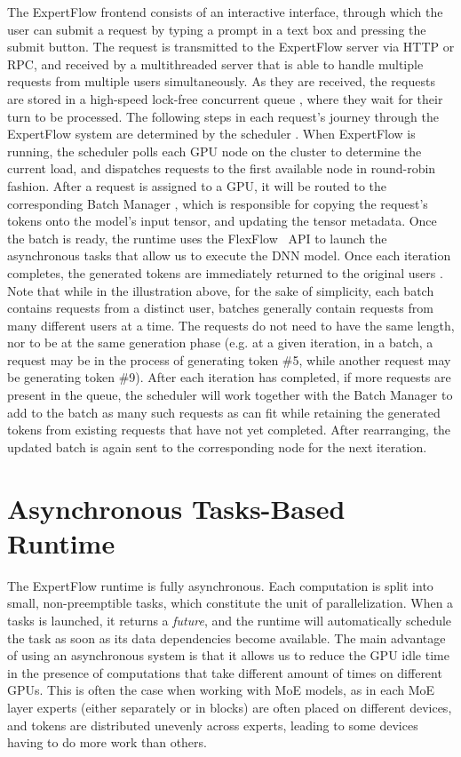 The ExpertFlow frontend consists of an interactive interface, through which the user can submit a request  by typing a prompt in a text box and pressing the submit button. The request is transmitted to the ExpertFlow server via HTTP or RPC, and received by a multithreaded server that is able to handle multiple requests from multiple users simultaneously. As they are received, the requests are stored in a high-speed lock-free concurrent queue , where they wait for their turn to be processed. The following steps in each request's journey through the ExpertFlow system are determined by the scheduler . When ExpertFlow is running, the scheduler polls each GPU node on the cluster to determine the current load, and dispatches requests to the first available node in round-robin fashion. After a request is assigned to a GPU, it will be routed to the corresponding Batch Manager , which is responsible for copying the request's tokens onto the model's input tensor, and updating the tensor metadata. Once the batch is ready, the runtime uses the FlexFlow~\cite{flexflow, unity} API to launch the asynchronous tasks  that allow us to execute the DNN model. Once each iteration completes, the generated tokens are immediately returned to the original users . Note that while in the illustration above, for the sake of simplicity, each batch contains requests from a distinct user, batches generally contain requests from many different users at a time. The requests do not need to have the same length, nor to be at the same generation phase (e.g. at a given iteration, in a batch, a request may be in the process of generating token \#5, while another request may be generating token \#9). After each iteration has completed, if more requests are present in the queue, the scheduler  will work together with the Batch Manager to add to the batch as many such requests as can fit while retaining the generated tokens from existing requests that have not yet completed. After rearranging, the updated batch is again sent to the corresponding node for the next iteration.

\section{Asynchronous Tasks-Based Runtime}\label{design-asynchronous-runtime}
The ExpertFlow runtime is fully asynchronous. Each computation is split into small, non-preemptible tasks, which constitute the unit of parallelization. When a tasks is  launched, it returns a \textit{future}, and the runtime will automatically schedule the task as soon as its data dependencies become available. The main advantage of using an asynchronous system is that it allows us to reduce the GPU idle time in the presence of computations that take different amount of times on different GPUs. This is often the case when working with MoE models, as in each MoE layer experts (either separately or in blocks) are often placed on different devices, and tokens are distributed unevenly across experts, leading to some devices having to do more work than others.  

